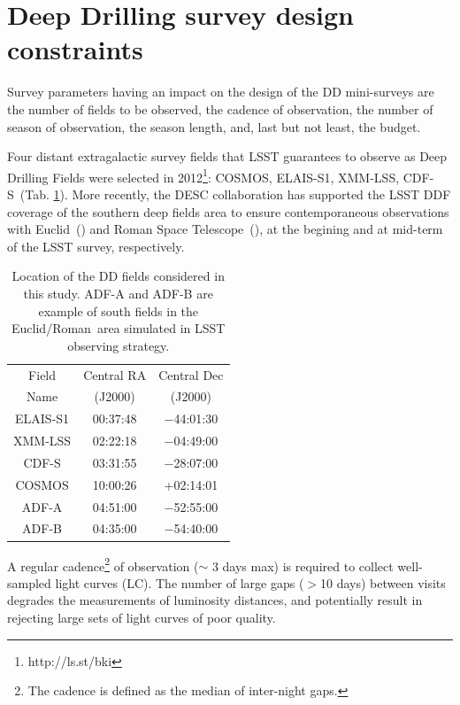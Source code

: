 \documentclass[skiphelvet,twocolumn]{aastex63}
\newcommand{\cosmos}{{COSMOS}}
\newcommand{\elais}{{ELAIS-S1}}
\newcommand{\xmm}{{XMM-LSS}}
\newcommand{\cdfs}{{CDF-S}}
\newcommand{\adfa}{{ADF-A}}
\newcommand{\adfb}{{ADF-B}}
\newcommand{\adfs}{{Euclid/Roman}}
\newcommand{\euclid}{{Euclid}}
\newcommand{\romanspace}{{Roman Space Telescope}}
\begin{document}
\section{Deep Drilling survey design constraints}
\label{sec:design}
Survey parameters having an impact on the design of the DD mini-surveys are the number of fields to be observed, the cadence of observation, the number of season of observation, the season length, and, last but not least, the budget.
\par
Four distant extragalactic survey fields that LSST guarantees to observe as Deep Drilling Fields were selected in 2012\footnote{http://ls.st/bki}: \cosmos, \elais, \xmm, \cdfs~(Tab. \ref{tab:locddf}). More recently, the DESC collaboration has supported the LSST DDF coverage of the southern deep fields area to ensure contemporaneous observations with \euclid~(\citealt{laureijs2011euclid,Amendola_2013}) and \romanspace~(\citealt{spergel2015widefield}), at the begining and at mid-term of the LSST survey, respectively.
\begin{table}[!htbp]
  \caption{Location of the DD fields considered in this study. ADF-A and ADF-B are example of south fields in the \adfs~area simulated in LSST observing strategy.}\label{tab:locddf}
  \begin{center}
    \begin{tabular}{c|c|c}
      \hline
      \hline
      Field & Central RA & Central Dec\\ 
      Name & (J2000)  & (J2000)\\
      \hline
     \elais & 00:37:48 & −44:01:30 \\
     \xmm & 02:22:18 &  −04:49:00 \\
     \cdfs & 03:31:55 & −28:07:00 \\
     \cosmos &10:00:26 & +02:14:01 \\
     \hline 
     \adfa & 04:51:00& −52:55:00 \\
     \adfb & 04:35:00 & −54:40:00 \\
      \hline
      \hline
      \end{tabular}
  \end{center}
\end{table}
\par
A regular cadence\footnote{The cadence is defined as the median of inter-night gaps.} of observation ($\sim$ 3 days max) is required to collect well-sampled light curves (LC). The number of large gaps ($>$10 days) between visits degrades the 
measurements of luminosity distances, and potentially result in rejecting large sets of light curves of poor quality.
\end{document}
